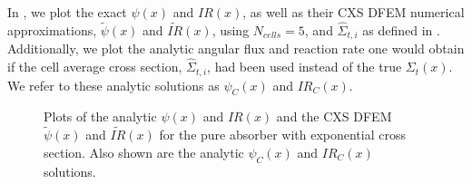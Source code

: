 In , we plot the exact $\psi(x)$ and $IR(x)$, as well as their CXS DFEM numerical approximations, $\widetilde{\psi}(x)$ and $\widetilde{IR}(x)$, using $N_{cells}=5$, and $\hat{\Sigma}_{t,i}$ as defined in . 
Additionally, we plot the analytic angular flux and reaction rate one would obtain if the cell average cross section, $\hat{\Sigma}_{t,i}$, had been used instead of the true $\Sigma_t(x)$.
We refer to these analytic solutions as $\psi_C(x)$ and $IR_C(x)$.
\begin{figure}[!htp]
\begin{center}
\end{center}
\caption{Plots of the analytic $\psi(x)$ and $IR(x)$ and the CXS DFEM $\widetilde{\psi}(x)$ and $\widetilde{IR}(x)$ for the pure absorber with exponential cross section.  Also shown are the analytic $\psi_C(x)$ and $IR_C(x)$ solutions.}
\label{fig:cxs_blades}
\end{figure}
